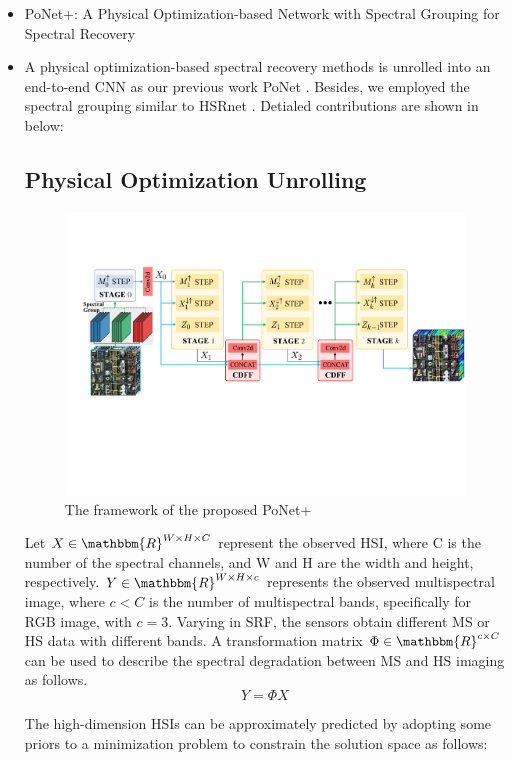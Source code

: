\documentclass{article}
\begin{document}
\begin{itemize}
\item PoNet+: A Physical Optimization-based Network with Spectral Grouping for Spectral Recovery                                 
\item A physical optimization-based spectral recovery methods is unrolled into an end-to-end CNN as our previous work PoNet \cite{ponet}. Besides, we employed the spectral grouping similar to HSRnet \cite{hsrnet}. Detialed contributions are shown in below:
\subsection{Physical Optimization Unrolling}
\begin{figure}[!h]
	\centering
	\includegraphics[width=\linewidth]{framework.pdf}
	\caption{The framework of the proposed PoNet+}
	\label{fig1}
\end{figure} 
\par{Let $X\in\mathbbm{R}^{W\times H\times C}$ represent the observed HSI, where C is the number of the spectral channels, and W and H are the width and height, respectively. $Y\in\mathbbm{R}^{W\times H\times c}$ represents the observed multispectral image, where $c<C$ is the number of multispectral bands, specifically for RGB image, with $c=3$. Varying in SRF, the sensors obtain different MS or HS data with different bands.  A  transformation  matrix $\Phi\in\mathbbm{R}^{c\times C}$can be used to describe the spectral degradation between MS and HS imaging as follows.   
}
\begin{equation}
	Y=\Phi X
\end{equation}
\par{The high-dimension HSIs can be approximately predicted by adopting some priors to a minimization problem to constrain the solution space as follows:
}
\end{itemize}
\end{document}
